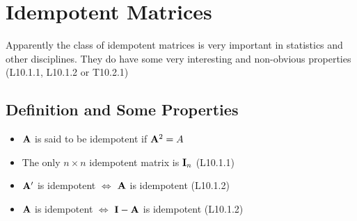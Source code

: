 \documentclass[a4paper, oneside]{book}
\begin{document}
\chapter{Idempotent Matrices}
Apparently the class of idempotent matrices is very important in statistics and other disciplines. They do have some very interesting and non-obvious properties (\eg L10.1.1, L10.1.2 or T10.2.1)

\section*{Definition and Some Properties}
\begin{itemize}
\item $\mathbf A$ is said to be idempotent if $\mathbf A^2 = A$
\item The only $n\times n$ idempotent matrix is $\mathbf I_n$ (L10.1.1)
\item $\mathbf A'$ is idempotent $\iff$ $\mathbf A$ is idempotent (L10.1.2)
\item $\mathbf A$ is idempotent $\iff$ $\mathbf{I-A}$ is idempotent (L10.1.2)
\end{itemize}
\end{document}

